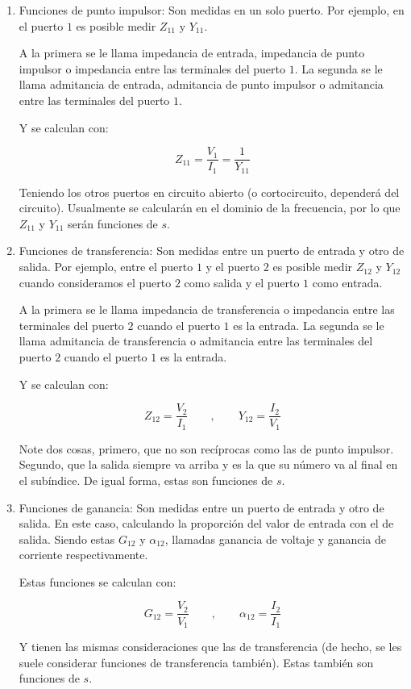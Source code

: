 \documentclass[12pt,letterpaper]{article}
\begin{document}
\begin{enumerate}
    \item Funciones de punto impulsor: Son medidas en un solo puerto. Por ejemplo, en el puerto $1$ es posible medir $Z_{11}$ y $Y_{11}$.
    
    A la primera se le llama impedancia de entrada, impedancia de punto impulsor o impedancia entre las terminales del puerto $1$. La segunda se le llama admitancia de entrada, admitancia de punto impulsor o admitancia entre las terminales del puerto $1$.

    Y se calculan con:

    \[
        Z_{11} = \frac{V_1}{I_1} = \frac{1}{Y_{11}}
    \]

    Teniendo los otros puertos en circuito abierto (o cortocircuito, dependerá del circuito). Usualmente se calcularán en el dominio de la frecuencia, por lo que $Z_{11}$ y $Y_{11}$ serán funciones de $s$.

    \item Funciones de transferencia: Son medidas entre un puerto de entrada y otro de salida. Por ejemplo, entre el puerto $1$ y el puerto $2$ es posible medir $Z_{12}$ y $Y_{12}$ cuando consideramos el puerto $2$ como salida y el puerto $1$ como entrada.
    
    A la primera se le llama impedancia de transferencia o impedancia entre las terminales del puerto $2$ cuando el puerto $1$ es la entrada. La segunda se le llama admitancia de transferencia o admitancia entre las terminales del puerto $2$ cuando el puerto $1$ es la entrada.

    Y se calculan con:

    \[
        Z_{12} = \frac{V_2}{I_1}\qquad,\qquad Y_{12} = \frac{I_2}{V_1}
    \]

    Note dos cosas, primero, que no son recíprocas como las de punto impulsor. Segundo, que la salida siempre va arriba y es la que su número va al final en el subíndice. De igual forma, estas son funciones de $s$.

    \item Funciones de ganancia: Son medidas entre un puerto de entrada y otro de salida. En este caso, calculando la proporción del valor de entrada con el de salida. Siendo estas $G_{12}$ y $\alpha_{12}$, llamadas ganancia de voltaje y ganancia de corriente respectivamente.
    
    Estas funciones se calculan con:

    \[
        G_{12} = \frac{V_2}{V_1}\qquad,\qquad \alpha_{12} = \frac{I_2}{I_1}
    \]

    Y tienen las mismas consideraciones que las de transferencia (de hecho, se les suele considerar funciones de transferencia también). Estas también son funciones de $s$.
\end{enumerate}
\end{document}
